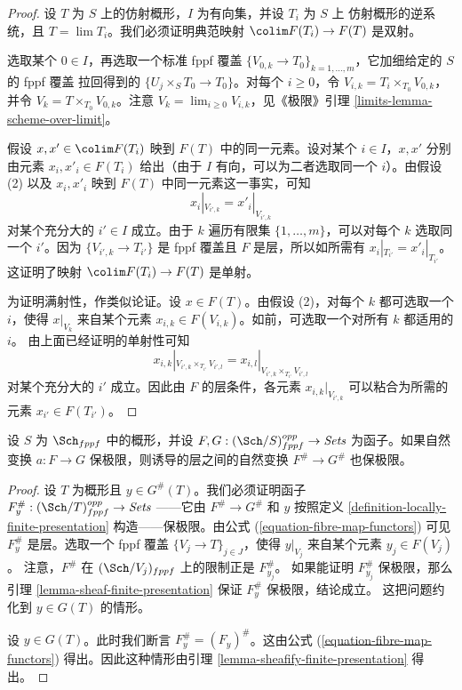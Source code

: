 \begin{proof}
设 $T$ 为 $S$ 上的仿射概形，$I$ 为有向集，并设 $T_i$ 为 $S$ 上
仿射概形的逆系统，且 $T=\lim T_i$。我们必须证明典范映射
$\colim F(T_i)\to F(T)$ 是双射。

\medskip\noindent
选取某个 $0\in I$，再选取一个标准 fppf 覆盖
$\{V_{0,k}\to T_0\}_{k=1,\ldots,m}$，它加细给定的 $S$ 的 fppf 覆盖
拉回得到的 $\{U_j\times_ST_0\to T_0\}$。对每个 $i\geq0$，令
$V_{i,k}=T_i\times_{T_0}V_{0,k}$，并令
$V_k=T\times_{T_0}V_{0,k}$。注意
$V_k=\lim_{i\geq0}V_{i,k}$，见《极限》引理
\ref{limits-lemma-scheme-over-limit}。

\medskip\noindent
假设 $x,x'\in\colim F(T_i)$ 映到 $F(T)$ 中的同一元素。设对某个
$i\in I$，$x,x'$ 分别由元素 $x_i,x'_i\in F(T_i)$ 给出（由于 $I$
有向，可以为二者选取同一个 $i$）。由假设 (2) 以及 $x_i,x'_i$
映到 $F(T)$ 中同一元素这一事实，可知
$$
x_i|_{V_{i', k}} = x'_i|_{V_{i', k}}
$$
对某个充分大的 $i'\in I$ 成立。由于 $k$ 遍历有限集
$\{1,\ldots,m\}$，可以对每个 $k$ 选取同一个 $i'$。因为
$\{V_{i',k}\to T_{i'}\}$ 是 fppf 覆盖且 $F$ 是层，所以如所需有
$x_i|_{T_{i'}}=x'_i|_{T_{i'}}$。这证明了映射
$\colim F(T_i)\to F(T)$ 是单射。

\medskip\noindent
为证明满射性，作类似论证。设 $x\in F(T)$。由假设 (2)，对每个 $k$
都可选取一个 $i$，使得 $x|_{V_k}$ 来自某个元素
$x_{i,k}\in F(V_{i,k})$。如前，可选取一个对所有 $k$ 都适用的 $i$。
由上面已经证明的单射性可知
$$
x_{i, k}|_{V_{i', k} \times_{T_{i'}} V_{i', l}}
=
x_{i, l}|_{V_{i', k} \times_{T_{i'}} V_{i', l}}
$$
对某个充分大的 $i'$ 成立。因此由 $F$ 的层条件，各元素
$x_{i,k}|_{V_{i',k}}$ 可以粘合为所需的元素 $x_{i'}\in F(T_{i'})$。
\end{proof}

\begin{lemma}
\label{lemma-sheafify-finite-presentation-map}
设 $S$ 为 $\Sch_{fppf}$ 中的概形，并设
$F,G:(\Sch/S)_{fppf}^{opp}\to\textit{Sets}$ 为函子。如果自然变换
$a:F\to G$ 保极限，则诱导的层之间的自然变换
$F^\#\to G^\#$ 也保极限。
\end{lemma}

\begin{proof}
设 $T$ 为概形且 $y\in G^\#(T)$。我们必须证明函子
$F^\#_y : (\Sch/T)_{fppf}^{opp} \to \textit{Sets}$
——它由 $F^\#\to G^\#$ 和 $y$ 按照定义
\ref{definition-locally-finite-presentation} 构造——保极限。由公式
(\ref{equation-fibre-map-functors}) 可见 $F^\#_y$ 是层。选取一个
fppf 覆盖 $\{V_j\to T\}_{j\in J}$，使得 $y|_{V_j}$ 来自某个元素
$y_j\in F(V_j)$。%
注意，$F^\#$ 在 $(\Sch/V_j)_{fppf}$ 上的限制正是
$F^\#_{y_j}$。%
如果能证明 $F^\#_{y_j}$ 保极限，那么引理
\ref{lemma-sheaf-finite-presentation} 保证 $F^\#_y$ 保极限，结论成立。
这把问题约化到 $y\in G(T)$ 的情形。

\medskip\noindent
设 $y\in G(T)$。此时我们断言 $F^\#_y=(F_y)^\#$。这由公式
(\ref{equation-fibre-map-functors}) 得出。因此这种情形由引理
\ref{lemma-sheafify-finite-presentation} 得出。
\end{proof}

